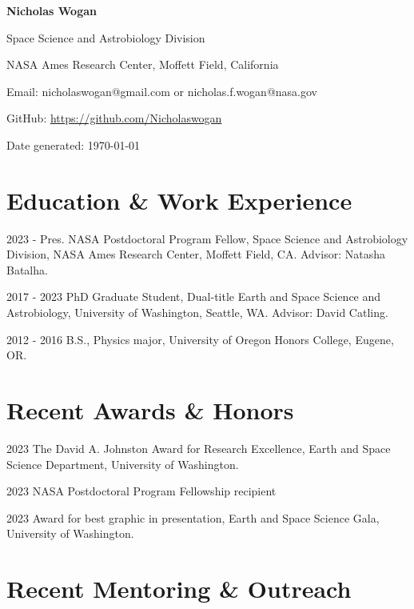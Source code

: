 \documentclass[12pt]{article}
\begin{document}
\begin{center}
\textbf{Nicholas Wogan}

Space Science and Astrobiology Division

NASA Ames Research Center, Moffett Field, California

Email: nicholaswogan@gmail.com or nicholas.f.wogan@nasa.gov

GitHub: \url{https://github.com/Nicholaswogan}

Date generated: \today

\end{center}

\section{Education \& Work Experience}

\begin{cvlist}
\item[2023 - Pres.]
  NASA Postdoctoral Program Fellow, Space Science and Astrobiology Division, NASA Ames Research Center, Moffett Field, CA. Advisor: Natasha Batalha.
\item[2017 - 2023]
  PhD Graduate Student, Dual-title Earth and Space Science and Astrobiology, University of Washington, Seattle, WA. Advisor: David Catling.
\item[2012 - 2016]
  B.S., Physics major, University of Oregon Honors College, Eugene, OR.
\end{cvlist}

\section{Recent Awards \& Honors}

\begin{cvlist}
\item[2023]
  The David A. Johnston Award for Research Excellence, Earth and Space Science Department, University of Washington.
\item[2023] 
  NASA Postdoctoral Program Fellowship recipient
\item[2023]
  Award for best graphic in presentation, Earth and Space Science Gala, University of Washington.
\end{cvlist}

\section{Recent Mentoring \& Outreach}
\end{document}
